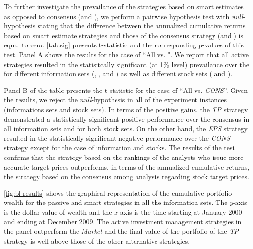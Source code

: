 \documentclass[a4paper,12pt,openright,notitlepage]{report}\usepackage[]{graphicx}\usepackage[]{color}
\begin{document}


To further investigate the prevailance  of the strategies based on smart estimates  as opposed to consensus (and \Market{}), we perform a pairwise hypothesis test with \emph{null}-hypothesis stating that the difference between the annualized cumulative returns based on smart estimate strategies and those of the consensus strategy (and \Market{}) is equal to zero. \ref{tab:sig} presents t-statistic and the corresponding p-values of this test. Panel A shows the results for the case of ``All vs. \Market{}". We report that all active strategies resulted in the statisitcally significant (at 1\% level) prevailance over the \Market{} for different information sets (\tr{}, \naive{}, and ) as well as different stock sets (\all{} and \same{}).

Panel B of the table presents the t-statistic for the case of ``All vs. \textit{CONS}''. Given the results, we reject the \emph{null}-hypothesis in all of the experiment instances (informations sets and stock sets). In terms of the positive gains, the \textit{TP} strategy demonstrated a statistically significant positive performance over the consensus in all information  sets and for both stock sets. On the other hand, the \textit{EPS} strategy resulted in the statistically significant negative performance over the \textit{CONS} strategy except for the case of  information and \all{} stocks. The results of the test confirms that the strategy based on the rankings of the analysts who issue more accurate target prices outperforms, in terms of the annualized cumulative returns, the strategy based on the consensus among analysts regarding stock target prices.



\ref{fig:bl-results} shows the graphical representation of the cumulative portfolio wealth for  the passive and smart strategies in all the information sets. The $y$-axis is the dollar value of wealth and the $x$-axis is the time starting at January 2000 and ending at December  2009. The active investment management strategies in the \tr{} panel outperform the \emph{Market} and the final value  of the portfolio of the \textit{TP} strategy is well above those of the other alternative strategies.
\end{document}

